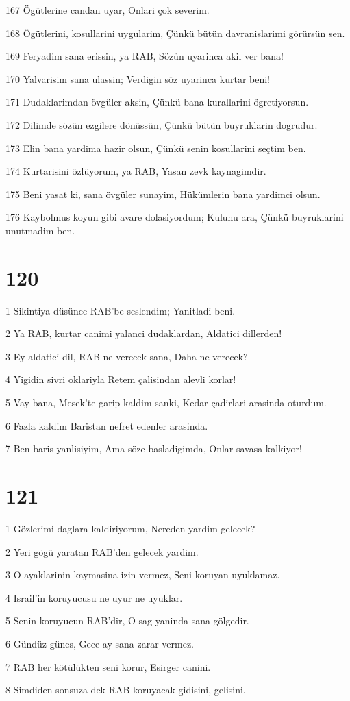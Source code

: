 \par 167 Ögütlerine candan uyar, Onlari çok severim.
\par 168 Ögütlerini, kosullarini uygularim, Çünkü bütün davranislarimi görürsün sen.
\par 169 Feryadim sana erissin, ya RAB, Sözün uyarinca akil ver bana!
\par 170 Yalvarisim sana ulassin; Verdigin söz uyarinca kurtar beni!
\par 171 Dudaklarimdan övgüler aksin, Çünkü bana kurallarini ögretiyorsun.
\par 172 Dilimde sözün ezgilere dönüssün, Çünkü bütün buyruklarin dogrudur.
\par 173 Elin bana yardima hazir olsun, Çünkü senin kosullarini seçtim ben.
\par 174 Kurtarisini özlüyorum, ya RAB, Yasan zevk kaynagimdir.
\par 175 Beni yasat ki, sana övgüler sunayim, Hükümlerin bana yardimci olsun.
\par 176 Kaybolmus koyun gibi avare dolasiyordum; Kulunu ara, Çünkü buyruklarini unutmadim ben.

\chapter{120}

\par 1 Sikintiya düsünce RAB'be seslendim; Yanitladi beni.
\par 2 Ya RAB, kurtar canimi yalanci dudaklardan, Aldatici dillerden!
\par 3 Ey aldatici dil, RAB ne verecek sana, Daha ne verecek?
\par 4 Yigidin sivri oklariyla Retem çalisindan alevli korlar!
\par 5 Vay bana, Mesek'te garip kaldim sanki, Kedar çadirlari arasinda oturdum.
\par 6 Fazla kaldim Baristan nefret edenler arasinda.
\par 7 Ben baris yanlisiyim, Ama söze basladigimda, Onlar savasa kalkiyor!

\chapter{121}

\par 1 Gözlerimi daglara kaldiriyorum, Nereden yardim gelecek?
\par 2 Yeri gögü yaratan RAB'den gelecek yardim.
\par 3 O ayaklarinin kaymasina izin vermez, Seni koruyan uyuklamaz.
\par 4 Israil'in koruyucusu ne uyur ne uyuklar.
\par 5 Senin koruyucun RAB'dir, O sag yaninda sana gölgedir.
\par 6 Gündüz günes, Gece ay sana zarar vermez.
\par 7 RAB her kötülükten seni korur, Esirger canini.
\par 8 Simdiden sonsuza dek RAB koruyacak gidisini, gelisini.

